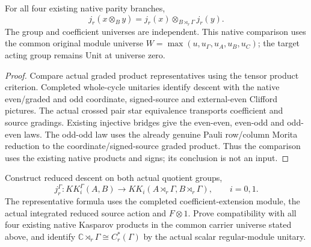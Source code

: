 \begin{proposition}\label{prop:descent-native-product}
\leanok
For all four existing native parity branches,
\[
 j_r(x\otimes_B y)=j_r(x)\otimes_{B\rtimes_r\Gamma}j_r(y).
\]
The group and coefficient universes are independent. This native comparison
uses the common original module universe
$W=\max(u,u_\Gamma,u_A,u_B,u_C)$; the target acting group remains
$\mathrm{Unit}$ at universe zero.
\end{proposition}
\begin{proof}
\leanok
Compare actual graded product representatives using the tensor product
criterion. Completed whole-cycle unitaries identify descent with the native
even/graded and odd coordinate, signed-source and external-even Clifford
pictures. The actual crossed pair star equivalence transports coefficient and
source gradings. Existing injective bridges give the even-even, even-odd and
odd-even laws. The odd-odd law uses the already genuine Pauli row/column Morita
reduction to the coordinate/signed-source graded product. Thus the comparison
uses the existing native products and signs; its conclusion is not an input.
\end{proof}


\begin{definition}\label{def:reduced-descent}
\leanok
Construct reduced descent on both actual quotient groups,
\[
 j_r^\Gamma:KK_i^\Gamma(A,B)\longrightarrow
 KK_i(A\rtimes_r\Gamma,B\rtimes_r\Gamma),\qquad i=0,1.
\]
The representative formula uses the completed coefficient-extension module,
the actual integrated reduced source action and $F\otimes1$. Prove
compatibility with all four existing native Kasparov products in the common
carrier universe stated above, and identify
$\mathbb C\rtimes_r\Gamma\cong C_r^*(\Gamma)$ by the actual scalar
regular-module unitary.
\end{definition}


